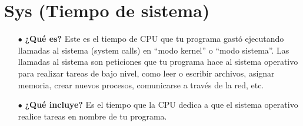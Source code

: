 \documentclass{article}
\begin{document}
\section*{Sys (Tiempo de sistema)}

\begin{itemize}[leftmargin=*]
    \item[$\bullet$] \textbf{¿Qué es?} Este es el tiempo de CPU que tu programa gastó ejecutando llamadas al sistema (system calls) en ``modo kernel'' o ``modo sistema''. Las llamadas al sistema son peticiones que tu programa hace al sistema operativo para realizar tareas de bajo nivel, como leer o escribir archivos, asignar memoria, crear nuevos procesos, comunicarse a través de la red, etc.
    
    \item[$\bullet$] \textbf{¿Qué incluye?} Es el tiempo que la CPU dedica a que el sistema operativo realice tareas en nombre de tu programa.
\end{itemize}
\end{document}
